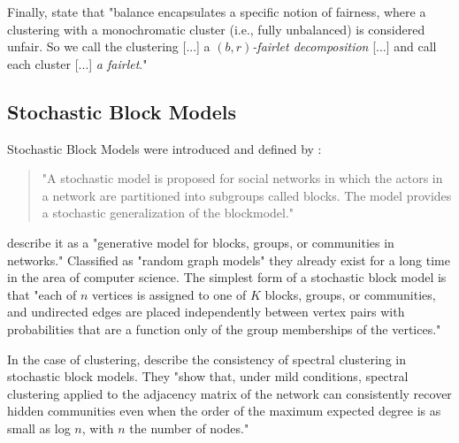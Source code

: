 Finally, \textcite[4]{Chierichetti2018} state that "balance encapsulates a specific notion of fairness, where a clustering with a monochromatic cluster (i.e., fully unbalanced) is considered unfair. So we call the clustering [...] a $(b, r)$\textit{-fairlet decomposition} [...] and call each cluster [...] \textit{a fairlet}." \autocite[4]{Chierichetti2018}


\subsection{Stochastic Block Models}

Stochastic Block Models were introduced and defined by \textcite[]{Holland1983}:

\begin{quote}
"A stochastic model is proposed for social networks in which the actors in a network are partitioned into subgroups called blocks. The model provides a stochastic generalization of the blockmodel."

\autocite[1]{Holland1983}
\end{quote}

\textcite[1]{Karrer2010StochasticNetworks} describe it as a "generative model for blocks, groups, or communities in networks." Classified as "random graph models" they already exist for a long time in the area of computer science.
The simplest form of a stochastic block model is that "each of $n$ vertices is assigned to one of $K$ blocks, groups, or communities, and undirected edges are placed independently between vertex pairs with probabilities that are a function only of the group memberships of the vertices." \autocite[1]{Karrer2010StochasticNetworks}

In the case of clustering, \textcite[]{Lei2013} describe the consistency of spectral clustering in stochastic block models. They "show that, under mild conditions, spectral clustering applied to the adjacency matrix of the network can consistently recover hidden communities even when the order of the maximum expected degree is as small as log $n$, with $n$ the number of nodes." \autocite[1]{Lei2013}
